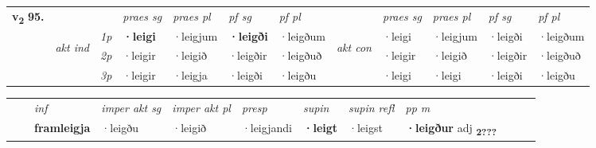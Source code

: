 \begin{tabular}{llllllllllll} \toprule
\multirow{4}{*}{{{\textbf{v{\textsubscript{2}}} \Large{\textbf{95.}}}}}  & &   &  \textit{praes sg}  & \textit{praes pl}  &\textit{ pf sg} & \textit{pf pl} &  &  \textit{praes sg}  & \textit{praes pl}  & \textit{pf sg} & \textit{pf pl } \\*
	\cmidrule{4-7} \cmidrule{9-12}
 & \multirow{3}{*}{\begin{turn}{90}\textit{akt ind}\end{turn}} & {\textit{1p}} & \textbf{·leigi} & ·leigjum    & \textbf{·leigði} & ·leigðum & \multirow{3}{*}{\begin{turn}{90}\textit{akt con}\end{turn}} &·leigi & ·leigjum & ·leigði & ·leigðum\\*
& &  {\textit{2p}} &  ·leigir  & ·leigið   & ·leigðir & ·leigðuð & & ·leigir & ·leigið & ·leigðir & ·leigðuð \\*
& &  {\textit{3p}} & ·leigir & ·leigja   & ·leigði & ·leigðu & & ·leigi & ·leigi& ·leigði & ·leigðu  \\*
\cmidrule{4-7} \cmidrule{9-12}
\end{tabular}


\begin{tabular}{llllllllllll}
 & & \textit{inf} & \textit{imper akt sg} & \textit{imper akt pl}   & \textit{presp} & \textit{supin} & \textit{supin refl} & \textit{pp m}     \\*
  & & \textbf{framleigja} & ·leigðu  & ·leigið   & ·leigjandi &  \textbf{·leigt} & ·leigst & \textbf{·leigður} adj \textbf{\textsubscript{2???}} \\*
\cmidrule{1-12}
\end{tabular}



